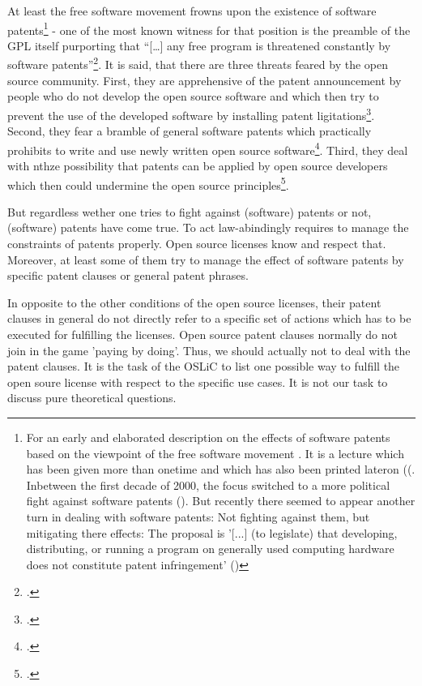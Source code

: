 At least the free software movement frowns upon the existence of software
patents\footnote{For an early and elaborated description on the effects of
software patents based on the viewpoint of the free software movement
\cite[see][\nopage wp]{Stallmann2001a}. It is a lecture which has been given
more than onetime and which has also been printed lateron (\cite[cf.][\nopage
wp]{Stallman2002a}(. Inbetween the first decade of 2000, the focus switched to a
more political fight against software patents (\cite[cf.][\nopage
wp]{Stallman2004a}). But recently there seemed to appear another turn in dealing
with software patents: Not fighting against them, but mitigating there effects:
The proposal is '[...] (to legislate) that developing, distributing, or running
a program on generally used computing hardware does not constitute patent
infringement' (\cite[cf.][\nowpage wp]{STalklmann2012a})} - one of the most
known witness for that position is the preamble of the GPL itself purporting
that \enquote{[\ldots] any free program is threatened constantly by software
patents}\footcite[cf.][wp]{Gpl20OsiLicense1991a}. It is said, that there are
three threats feared by the open source community. First, they are apprehensive
of the patent announcement by people who do not develop the open source software
and which then try to prevent the use of the developed software by installing
patent ligitations\footcite[cf.][234]{JaeMet2011a}. Second, they fear a bramble
of general software patents which practically prohibits to write and use newly
written open source software\footcite[cf.][234]{JaeMet2011a}. Third, they deal
with nthze possibility that patents can be applied by open source developers
which then could undermine the open source
principles\footcite[cf.][235]{JaeMet2011a}.

But regardless wether one tries to fight against (software) patents or not,
(software) patents have come true. To act law-abindingly requires to manage the
constraints of patents properly. Open source licenses know and respect that.
Moreover, at least some of them try to manage the effect of software patents by
specific patent clauses or general patent phrases.

In opposite to the other conditions of the open source licenses, their patent
clauses in general do not directly refer to a specific set of actions which has
to be executed for fulfilling the licenses. Open source patent clauses normally
do not join in the game 'paying by doing'. Thus, we should actually not to deal
with the patent clauses. It is the task of the OSLiC to list one possible way to
fulfill the open soure license with respect to the specific use cases. It is not
our task to discuss pure theoretical questions.

